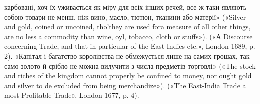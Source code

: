 карбовані, хоч їх уживається як міру для всіх інших речей, все ж таки
являють собою товари не менш, ніж вино, масло, тютюн, тканини або матерії»
(«Silver and gold, coined or uncoined, tho’they are used fora measure
of all other things, are no less a commodity than wine, oyl, tobacco,
cloth or stuffs»). («А Discourse concerning Trade, and that in particular
of the East-Indies etc.», London 1689, p. 2). «Капітал і багатство королівства
не обмежується лише на самих грошах, так само золото й срібло
не можна вилучити з числа предметів торговлі» («The stock and riches
of the kingdom cannot properly be confined to money, nor ought gold and
silver to de excluded from being merchandize»). («The East-India Trade
a most Profitable Trade», London 1677, p. 4).